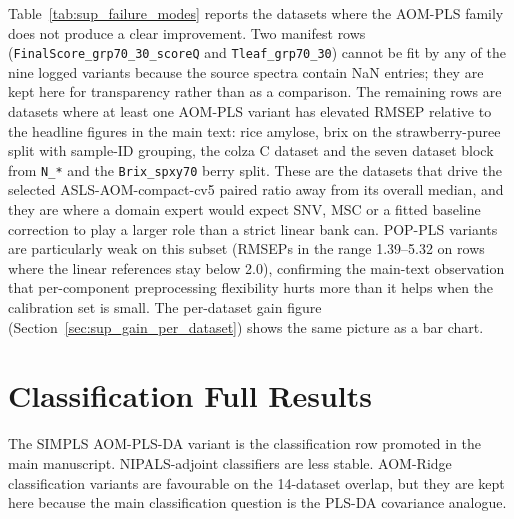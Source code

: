 \documentclass[11pt,a4paper]{article}
\newcommand{\code}[1]{\nolinkurl{#1}}
\begin{document}
Table~\ref{tab:sup_failure_modes} reports the datasets where the AOM-PLS
family does not produce a clear improvement.  Two manifest rows
(\code{FinalScore\_grp70\_30\_scoreQ} and \code{Tleaf\_grp70\_30}) cannot be
fit by any of the nine logged variants because the source spectra contain
NaN entries; they are kept here for transparency rather than as a comparison.
The remaining rows are datasets where at least one AOM-PLS variant has
elevated RMSEP relative to the headline figures in the main text: rice
amylose, brix on the strawberry-puree split with sample-ID grouping, the
colza C dataset and the seven dataset block from \code{N\_*} and the
\code{Brix\_spxy70} berry split.  These are the datasets that drive the
selected ASLS-AOM-compact-cv5 paired ratio away from its overall median, and
they are where a domain expert would expect SNV, MSC or a fitted baseline
correction to play a larger role than a strict linear bank can.  POP-PLS
variants are particularly weak on this subset (RMSEPs in the range 1.39--5.32
on rows where the linear references stay below 2.0), confirming the main-text
observation that per-component preprocessing flexibility hurts more than it
helps when the calibration set is small.  The per-dataset gain figure
(Section~\ref{sec:sup_gain_per_dataset}) shows the same picture as a bar
chart.

\begin{table}[h]
\centering
\caption{Datasets where at least one AOM-PLS variant has elevated RMSEP or
where every variant fails because of NaN inputs.  ``Variants logged'' counts
the nine AOM-PLS and POP-PLS rows checked; ``Finite RMSEP rows'' counts how
many produced a finite test RMSEP.}
\label{tab:sup_failure_modes}
\small

\end{table}

\section{Classification Full Results}

\begin{table}[h]
\centering
\caption{Full classification paired comparisons.  Positive differences favour
the AOM or POP candidate over PLS-DA.}
\label{tab:sup_classification_full}
\small

\end{table}

The SIMPLS AOM-PLS-DA variant is the classification row promoted in the main
manuscript.  NIPALS-adjoint classifiers are less stable.  AOM-Ridge
classification variants are favourable on the 14-dataset overlap, but they
are kept here because the main classification question is the PLS-DA
covariance analogue.
\end{document}
